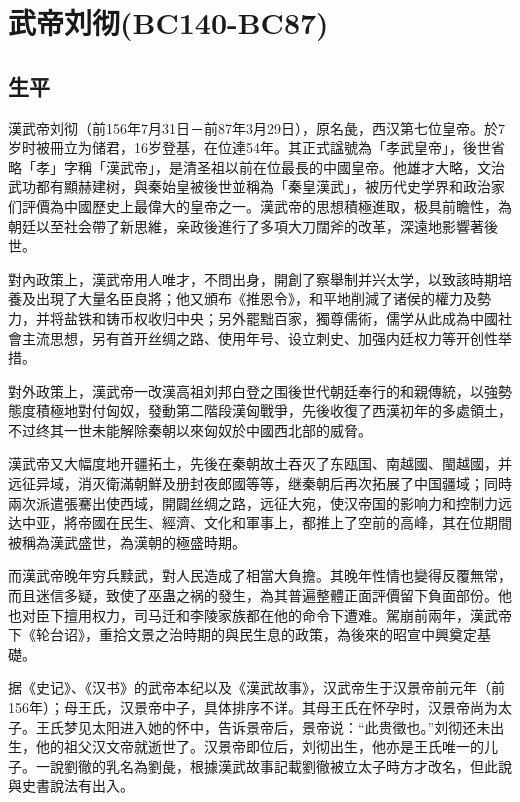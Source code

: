 
\section{武帝刘彻\tiny(BC140-BC87)}

\subsection{生平}

漢武帝刘彻（前156年7月31日－前87年3月29日），原名彘，西汉第七位皇帝。於7岁时被冊立为储君，16岁登基，在位達54年。其正式諡號為「孝武皇帝」，後世省略「孝」字稱「漢武帝」，是清圣祖以前在位最長的中國皇帝。他雄才大略，文治武功都有顯赫建树，與秦始皇被後世並稱為「秦皇漢武」，被历代史学界和政治家们評價為中國歷史上最偉大的皇帝之一。漢武帝的思想積極進取，极具前瞻性，為朝廷以至社会帶了新思維，亲政後進行了多項大刀闊斧的改革，深遠地影響著後世。

對內政策上，漢武帝用人唯才，不問出身，開創了察舉制并兴太学，以致該時期培養及出現了大量名臣良將；他又頒布《推恩令》，和平地削減了诸侯的權力及勢力，并将盐铁和铸币权收归中央；另外罷黜百家，獨尊儒術，儒学从此成為中國社會主流思想，另有首开丝绸之路、使用年号、设立刺史、加强内廷权力等开创性举措。

對外政策上，漢武帝一改漢高祖刘邦白登之围後世代朝廷奉行的和親傳統，以強勢態度積極地對付匈奴，發動第二階段漢匈戰爭，先後收復了西漢初年的多處領土，不过终其一世未能解除秦朝以來匈奴於中國西北部的威脅。

漢武帝又大幅度地开疆拓土，先後在秦朝故土吞灭了东瓯国、南越國、閩越國，并远征异域，消灭衛滿朝鮮及册封夜郎國等等，继秦朝后再次拓展了中国疆域；同時兩次派遣張騫出使西域，開闢丝绸之路，远征大宛，使汉帝国的影响力和控制力远达中亚，將帝國在民生、經濟、文化和軍事上，都推上了空前的高峰，其在位期間被稱為漢武盛世，為漢朝的極盛時期。

而漢武帝晚年穷兵黩武，對人民造成了相當大負擔。其晚年性情也變得反覆無常，而且迷信多疑，致使了巫蛊之祸的發生，為其普遍整體正面評價留下負面部份。他也对臣下擅用权力，司马迁和李陵家族都在他的命令下遭难。駕崩前兩年，漢武帝下《轮台诏》，重拾文景之治時期的與民生息的政策，為後來的昭宣中興奠定基礎。

据《史记》、《汉书》的武帝本纪以及《漢武故事》，汉武帝生于汉景帝前元年（前156年）；母王氏，汉景帝中子，具体排序不详。其母王氏在怀孕时，汉景帝尚为太子。王氏梦见太阳进入她的怀中，告诉景帝后，景帝说：“此贵徵也。”刘彻还未出生，他的祖父汉文帝就逝世了。汉景帝即位后，刘彻出生，他亦是王氏唯一的儿子。一說劉徹的乳名為劉彘，根據漢武故事記載劉徹被立太子時方才改名，但此說與史書說法有出入。

